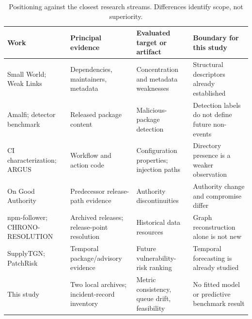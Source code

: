 \begin{table}[t]
\caption{Positioning against the closest research streams. Differences identify scope, not superiority.}
\label{tab:positioning}
\centering\footnotesize
\begin{tabularx}{\textwidth}{@{}>{\raggedright\arraybackslash}p{}YYY@{}}
\toprule
Work & Principal evidence & Evaluated target or artifact & Boundary for this study \\
\midrule
Small World; Weak Links~\cite{zimmermann2019,zahan2022} & Dependencies, maintainers, metadata & Concentration and metadata weaknesses & Structural descriptors already established \\
Amalfi; detector benchmark~\cite{sejfia2022,guo2026} & Released package content & Malicious-package detection & Detection labels do not define future non-events \\
CI characterization; ARGUS~\cite{koishybayev2022,muralee2023} & Workflow and action code & Configuration properties; injection paths & Directory presence is a weaker observation \\
On Good Authority~\cite{santos2026} & Predecessor release-path evidence & Authority discontinuities & Authority change and compromise differ \\
npm-follower; CHRONO-RESOLUTION~\cite{pinckney2023,rahman2026} & Archived releases; release-point resolution & Historical data resources & Graph reconstruction alone is not new \\
SupplyTGN; PatchRisk~\cite{supplytgn2026,patchrisk2026} & Temporal package/advisory evidence & Future vulnerability-risk ranking & Temporal forecasting is already studied \\
This study & Two local archives; incident-record inventory & Metric consistency, queue drift, feasibility & No fitted model or predictive benchmark result \\
\bottomrule
\end{tabularx}
\end{table}
